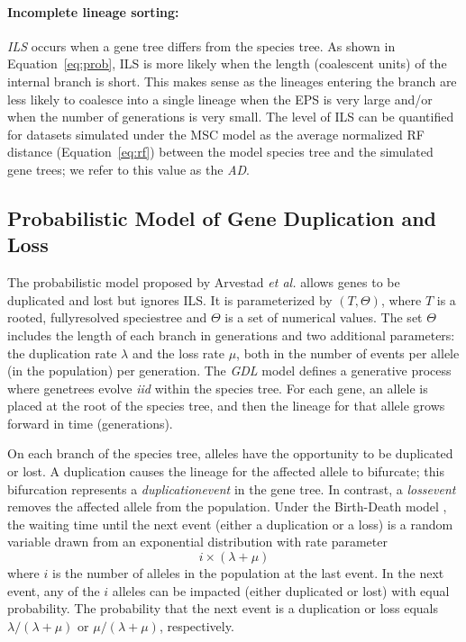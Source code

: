 \paragraph{Incomplete lineage sorting:} 
\textit{\Gls{ILS}} occurs when a gene tree differs from the species tree.
As shown in Equation~\ref{eq:prob}, ILS is more likely when the length (coalescent units) of the internal branch is short.
This makes sense as the lineages entering the branch are less likely to coalesce into a single lineage when the EPS is very large and/or when the number of generations is very small.
The level of ILS can be quantified for datasets simulated under the MSC model as the average normalized \gls{RF} distance (Equation~\ref{eq:rf}) between the model species tree and the simulated gene trees; we refer to this value as the \textit{\gls{AD}}.

\subsection{Probabilistic Model of Gene Duplication and Loss}
\label{sec:background-gdl}
The  probabilistic  model proposed by Arvestad {\em et al.} \cite{arvestad2003bayesian} allows genes to be duplicated and lost but ignores ILS.
It is parameterized by $(T, \Theta)$, where $T$ is a \gls{rooted}, \gls{fullyresolved} \gls{speciestree} and $\Theta$ is a set of numerical values.
The set $\Theta$ includes the length of each branch in generations and two additional parameters: the duplication rate $\lambda$ and the loss rate $\mu$, both in the number of events per \gls{allele} (in the population) per generation.
The \textit{\gls{GDL}} model defines a generative process where \glspl{genetree} evolve \textit{\gls{iid}} within the species tree. 
For each gene, an allele is placed at the root of the species tree, and then the \gls{lineage} for that allele grows forward in time (generations).

On each branch of the species tree, alleles have the opportunity to be duplicated or lost.
A duplication causes the lineage for the affected allele to bifurcate; this bifurcation represents a \textit{\gls{duplicationevent}} in the gene tree.
In contrast, a \textit{\gls{lossevent}} removes the affected allele from the population.
Under the Birth-Death model \cite{kendall1948on, nee1994reconstructed}, the waiting time until the next event (either a duplication or a loss) is a random variable drawn from an exponential distribution with rate parameter
\begin{equation}
	i \times (\lambda + \mu)
\end{equation}
where $i$ is the number of alleles in the population at the last event.
In the next event, any of the $i$ alleles can be impacted (either duplicated or lost) with equal probability.
The probability that the next event is a duplication or loss equals $\lambda/(\lambda + \mu)$ or $\mu/(\lambda + \mu)$, respectively.

